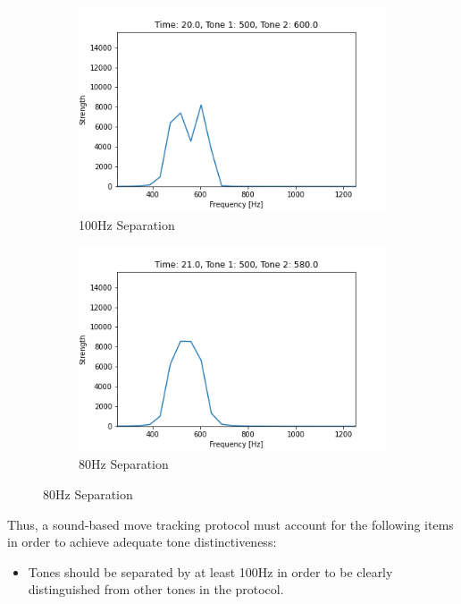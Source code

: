 \begin{figure}[h]
\begin{subfigure}{0.5\textwidth}
        \centering
        \caption{100Hz Separation}
        \label{fig:tone-sep-100}
        \includegraphics[width=.90\linewidth]{Figures/4 Protocol Design/Tone Distinctiveness/20.03.png}
        \vspace*{2mm}
    \end{subfigure}%
    \begin{subfigure}{0.5\textwidth}
        \centering
        \caption{80Hz Separation}
        \label{fig:tone-sep-80}
        \includegraphics[width=.90\linewidth]{Figures/4 Protocol Design/Tone Distinctiveness/21.01.png}
        \vspace*{2mm}
    \end{subfigure}%
\end{figure}

Thus, a sound-based move tracking protocol must account for the
following items in order to achieve adequate tone distinctiveness:

\begin{itemize}

    \item Tones should be separated by at least 100Hz in order to be
    clearly distinguished from other tones in the protocol.

\end{itemize}



